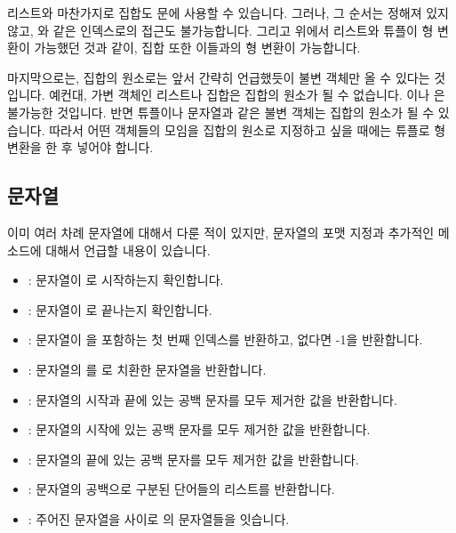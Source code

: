 \documentclass[../main.tex]{subfiles}
\begin{document}
리스트와 마찬가지로 집합도  문에 사용할 수 있습니다.
그러나, 그 순서는 정해져 있지 않고, \pyin{[i]}와 같은 인덱스로의 접근도 불가능합니다.
그리고 위에서 리스트와 튜플이 형 변환이 가능했던 것과 같이, 집합 또한 이들과의 형 변환이 가능합니다.

마지막으로는, 집합의 원소로는 앞서 간략히 언급했듯이 불변 객체만 올 수 있다는 것입니다.
예컨대, 가변 객체인 리스트나 집합은 집합의 원소가 될 수 없습니다.
이나 은 불가능한 것입니다.
반면 튜플이나 문자열과 같은 불변 객체는 집합의 원소가 될 수 있습니다.
따라서 어떤 객체들의 모임을 집합의 원소로 지정하고 싶을 때에는 튜플로 형 변환을 한 후 넣어야 합니다.

\subsection{문자열}
이미 여러 차례 문자열에 대해서 다룬 적이 있지만, 문자열의 포맷 지정과 추가적인 메소드에 대해서 언급할 내용이 있습니다.
\begin{itemize}
    \item {}: 문자열이 로 시작하는지 확인합니다.
    \item {}: 문자열이 로 끝나는지 확인합니다.
    \item {}: 문자열이 을 포함하는 첫 번째 인덱스를 반환하고, 없다면 -1을 반환합니다.
    \item {}: 문자열의 를 로 치환한 문자열을 반환합니다.
    \item {}: 문자열의 시작과 끝에 있는 공백 문자를 모두 제거한 값을 반환합니다.
    \item {}: 문자열의 시작에 있는 공백 문자를 모두 제거한 값을 반환합니다.
    \item {}: 문자열의 끝에 있는 공백 문자를 모두 제거한 값을 반환합니다.
    \item {}: 문자열의 공백으로 구분된 단어들의 리스트를 반환합니다.
    \item {}: 주어진 문자열을 사이로 의 문자열들을 잇습니다.
\end{itemize}
\end{document}
